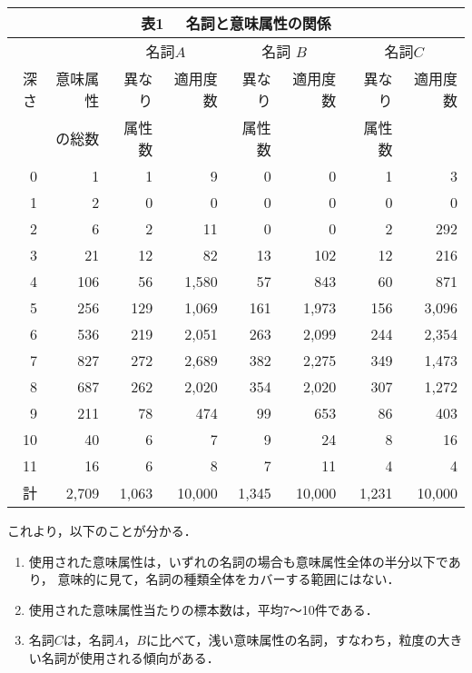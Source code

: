  \begin{center}
   \setlength{\tabcolsep}{3pt}
   \small
    \begin{tabular}{|r|r|r|r|r|r|r|r|}
    \multicolumn{8}{c}{{\small {\bf 表1} \  \ 名詞と意味属性の関係}}\\ \hline
    & &\multicolumn{2}{|c|}{名詞$A$}&\multicolumn{2}{|c|}{名詞
    $B$}&\multicolumn{2}{|c|}{名詞$C$}\\ \cline{3-8}
    深さ&意味属性&異なり&適用度数&異なり&適用度数&異な
    り&適用度数\\
    &の総数&属性数&&属性数&&属性数& \\ \hline
    0&1& 1& 9& 0& 0& 1& 3\\ \hline
    1& 2& 0& 0& 0& 0& 0& 0\\ \hline
    2& 6& 2& 11& 0& 0& 2& 292\\ \hline
     3&21&12&82&13&102&12&216\\ \hline
    4&106&56 &  1,580&    57 &   843 &    60 &   871 \\
    \hline
    5&   256 &   129 &  1,069&   161 &  1,973&   156 &  3,096 \\
    \hline
    6&   536 &   219 &  2,051&   263 &  2,099&   244 &  2,354 \\
    \hline
    7&   827 &   272 &  2,689&   382 &  2,275&   349 &  1,473 \\
    \hline
    8&   687 &   262 &  2,020&   354 &  2,020&   307 &  1,272 \\
    \hline
    9&   211 &    78 &   474 &    99 &   653 &    86 &   403 \\
    \hline
    10&    40 &     6 &     7 &     9 &    24 &     8 &    16\\
    \hline
   11&    16 &     6 &     8 &     7 &    11 &     4 &     4\\
    \hline
   計&2,709&  1,063& 10,000&  1,345& 10,000&  1,231& 10,000\\  \hline
\end{tabular}
\end{center}

これより，以下のことが分かる．\vspace{\baselineskip}
\renewcommand{\labelenumi}{}
\begin{enumerate}
\item 使用された意味属性は，いずれの名詞の場合も意味属性全体の半分以下であり，
  意味的に見て，名詞の種類全体をカバーする範囲にはない．
\item 使用された意味属性当たりの標本数は，平均7〜10件である．
\item 名詞$C$は，名詞$A，B$に比べて，浅い意味属性の名詞，すなわち，粒度の大き
  い名詞が使用される傾向がある．
\end{enumerate}\vspace{\baselineskip}

